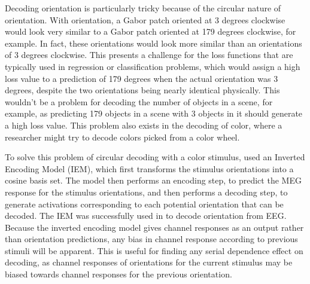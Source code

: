 \documentclass[../main.tex]{subfiles}
\begin{document}
Decoding orientation is particularly tricky because of the circular nature of orientation. With orientation, a Gabor patch oriented at 3 degrees clockwise would look very similar to a Gabor patch oriented at 179 degrees clockwise, for example. In fact, these orientations would look more similar than an orientations of 3 degrees clockwise. This presents a challenge for the loss functions that are typically used in regression or classification problems, which would assign a high loss value to a prediction of 179 degrees when the actual orientation was 3 degrees, despite the two orientations being nearly identical physically. This wouldn't be a problem for decoding the number of objects in a scene, for example, as predicting 179 objects in a scene with 3 objects in it should generate a high loss value. This problem also exists in the decoding of color, where a researcher might try to decode colors picked from a color wheel. 

To solve this problem of circular decoding with a color stimulus, \cite{Brouwer09} used an Inverted Encoding Model (IEM), which first transforms the stimulus orientations into a cosine basis set. The model then performs an encoding step, to predict the MEG response for the stimulus orientations, and then performs a decoding step, to generate activations corresponding to each potential orientation that can be decoded. The IEM was successfully used in \cite{GARCIA2013515, sprague_serences_2013, sprague_saproo_serences_2015} to decode orientation from EEG. Because the inverted encoding model gives channel responses as an output rather than orientation predictions, any bias in channel response according to previous stimuli will be apparent. This is useful for finding any serial dependence effect on decoding, as channel responses of orientations for the current stimulus may be biased towards channel responses for the previous orientation.
\end{document}
